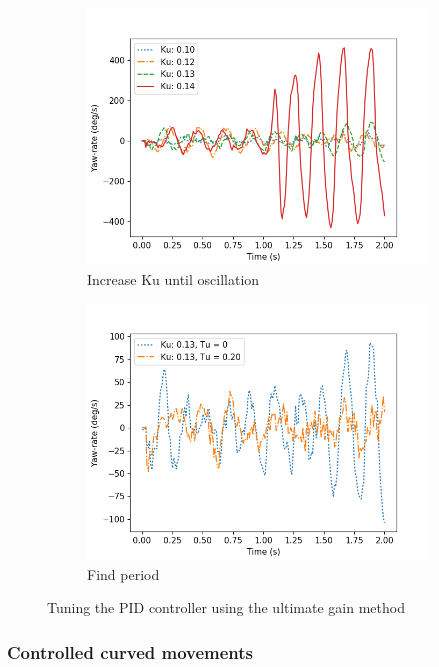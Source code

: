\begin{figure}
	\begin{subfigure}[b]{0.49\textwidth}
		\includegraphics[width=\textwidth]{pics/straight_ku.png}
		\caption{Increase Ku until oscillation}
		\label{fig:ultimate_gain}
	\end{subfigure}
	\begin{subfigure}[b]{0.49\textwidth}
		\includegraphics[width=\textwidth]{pics/straight_ku_with_tu.png}
		\caption{Find period}
		\label{fig:gain_tuning}
	\end{subfigure}
	\caption{Tuning the PID controller using the ultimate gain method}
\end{figure}

\subsubsection{Controlled curved movements} 

